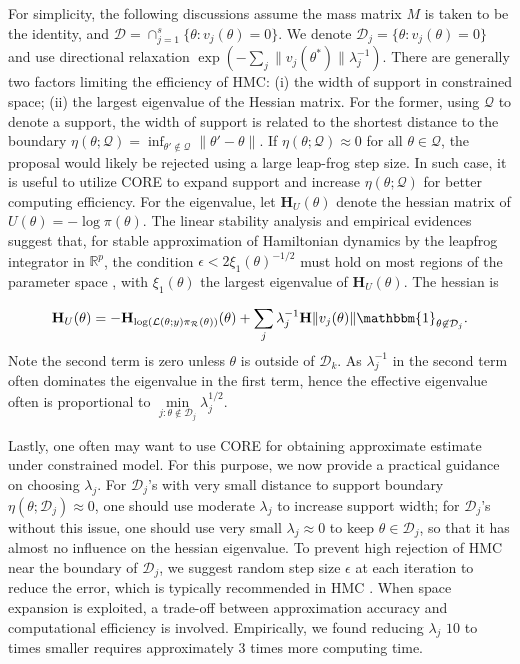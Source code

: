 \documentclass[10pt,fleqn]{article} \pdfoutput=1
\newcommand{\bb}[1]{\mathbb{#1}} \newcommand{\mc}[1]{\mathcal{#1}}
\DeclareMathOperator{\1}{\mathbbm{1}} \DeclareMathOperator{\bigO}{\mc O}
\newcommand{\dt}{\epsilon} %
\newcommand{\mass}{M} %
\newcommand{\hess}{\mathbf{H}} %
\begin{document}
For simplicity, the following discussions assume the mass matrix $\mass$ is
taken to be the identity, and $\mc D= \cap_{j=1}^s\{\theta :v_j(\theta)=0 \}$.
We denote $\mc D_j= \{\theta :v_j(\theta)=0 \}$ and use directional relaxation
$\exp(-\sum_j{\|v_j(\theta^*)\|}{\lambda_j^{-1}})$. There are generally two factors limiting the efficiency of HMC:
(i) the width of support in constrained space; (ii) the largest eigenvalue of the Hessian matrix.
For the former, using $\mc Q$ to denote a support, the width of support is related to the shortest
distance to the boundary $\eta (\theta; {\mc Q})= \inf_{\theta'\not\in \mc
		Q}\|\theta'-\theta\|$. If $\eta (\theta; {\mc Q}) \approx 0$ for all $\theta\in \mc Q$,
		 the proposal would likely be rejected using a large leap-frog step size. In such case, 
		 it is useful to utilize CORE to expand support and  
increase $\eta (\theta; {\mc Q})$ for better computing efficiency. For the eigenvalue,
let $\hess_U(\theta)$ denote the hessian matrix of
$U(\theta) = - \log \pi(\theta)$. 
The linear stability analysis and
empirical evidences suggest that, for stable approximation of Hamiltonian
dynamics by the leapfrog integrator in $\bb R^p$, the condition $\dt <
	2\xi_1(\theta)^{-1/2}$ must hold on most regions of the parameter space
\citep{hairer06}, with $\xi_1(\theta)$ the largest
eigenvalue of $\hess_U(\theta)$. The hessian is

\begin{equation} \label{eq:hessian_extrinsic}
 \hess_U(\theta) = -\hess_{\log
		(\mathcal L(\theta;y) \pi_{\mc R}(\theta))
	}(\theta)+\sum_j \lambda_j^{-1} \hess {\|v_j(\theta)\|}
	\mathbbm{1}_{\theta\not\in \mc D_j}. \end{equation}
Note the second term is zero unless $\theta$ is outside of $\mc D_k$. As $\lambda^{-1}_j$ in the
second term often dominates the eigenvalue in the first term, hence the effective eigenvalue often is
proportional to $ \underset{j: \theta \not\in \mc D_j}{\min}\lambda_j^{1/2}$.

Lastly, one often may want to use CORE for obtaining approximate estimate under constrained model.
For this purpose, we now provide a practical guidance on choosing $\lambda_j$.  For $\mc
D_j$'s with very small distance to support boundary $\eta(\theta;\mc D_j)\approx 0$, one should use moderate $\lambda_j$
to increase support width;  for $\mc D_j$'s
without this issue, one should use very small $\lambda_j\approx 0$ to keep $\theta\in\mc D_j$, so that it has almost no influence on the hessian eigenvalue. 
To prevent high rejection of HMC near the boundary of $\mc D_j$, we suggest random step size $\epsilon$ at each iteration to
reduce the error, which is typically recommended in HMC \citep{neal2011mcmc}. When space expansion is exploited, a trade-off between approximation accuracy
and computational efficiency is involved. Empirically, we found reducing
$\lambda_{j}$ $10$ to times smaller requires approximately $3$ times more
computing time.
\end{document}
